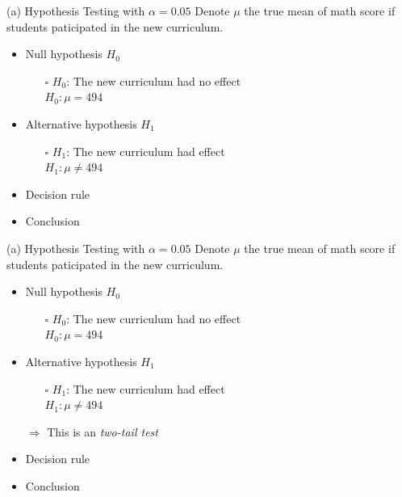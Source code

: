 \documentclass[
  10pt,
  ignorenonframetext,
]{beamer}
\begin{document}
\begin{frame}{(a) Hypothesis Testing with \(\alpha = 0.05\)}
\protect\hypertarget{a-hypothesis-testing-with-alpha-0.05-1}{}
Denote \(\mu\) the true mean of math score if students paticipated in
the new curriculum.\\

\begin{itemize}
    \item Null hypothesis $H_0$
        \begin{itemize}
            \item [$\square$] $H_0$: The new curriculum had no effect\\
                  $H_0: \mu = 494$
    \end{itemize}
    \vspace{1.5mm}
    \item Alternative hypothesis $H_1$
        \begin{itemize}
            \item [$\square$] $H_1$: The new curriculum had effect\\
                  $H_1: \mu \neq 494$
        \end{itemize}
    \vspace{1.5mm}
    \item Decision rule
    \vspace{1.5mm}
    \item Conclusion
\end{itemize}
\end{frame}

\begin{frame}{(a) Hypothesis Testing with \(\alpha = 0.05\)}
\protect\hypertarget{a-hypothesis-testing-with-alpha-0.05-2}{}
Denote \(\mu\) the true mean of math score if students paticipated in
the new curriculum.\\

\begin{itemize}
    \item Null hypothesis $H_0$
        \begin{itemize}
            \item [$\square$] $H_0$: The new curriculum had no effect\\
                  $H_0: \mu = 494$
    \end{itemize}
    \vspace{1.5mm}
    \item Alternative hypothesis $H_1$
        \begin{itemize}
            \item [$\square$] $H_1$: The new curriculum had effect\\
                  $H_1: \mu \neq 494$\\
        \end{itemize}
        $\Longrightarrow$ This is an \textit{two-tail test}
    \vspace{1.5mm}
    \item Decision rule
    \vspace{1.5mm}
    \item Conclusion
\end{itemize}
\end{frame}
\end{document}
